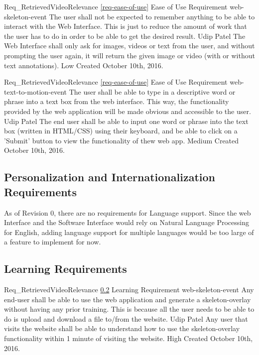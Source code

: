 \documentclass{scrreprt}
\begin{document}
\requirement
{Req_RetrievedVideoRelevance}
{\ref{req-ease-of-use} Ease of Use Requirement}
{web-skeleton-event}
{The user shall not be expected to remember anything to be able to interact with the Web Interface.}
{This is just to reduce the amount of work that the user has to do in order to be able to get the desired result.}
{Udip Patel}
{The Web Interface shall only ask for images, videos or text from the user, and without prompting the user again, it will return the given image or video (with or without text annotations).}
{Low}
{Created October 10th, 2016.}

\requirement
{Req_RetrievedVideoRelevance}
{\ref{req-ease-of-use} Ease of Use Requirement}
{web-text-to-motion-event}
{The user shall be able to type in a descriptive word or phrase into a text box from the web interface.}
{This way, the functionality provided by the web application will be made obvious and accessible to the user.}
{Udip Patel}
{The end user shall be able to input one word or phrase into the text box (written in HTML/CSS) using their keyboard, and be able to click on a 'Submit' button to view the functionality of thew web app.}
{Medium}
{Created October 10th, 2016.}

\subsection{Personalization and Internationalization Requirements}

As of Revision 0, there are no requirements for Language support. Since the web Interface and the Software Interface would rely on Natural Language Processing for English, adding language support for multiple languages would be too large of a feature to implement for now.

\subsection{Learning Requirements}
\label{req-learning}

\requirement
{Req_RetrievedVideoRelevance}
{\ref{req-learning} Learning Requirement}
{web-skeleton-event}
{Any end-user shall be able to use the web application and generate a skeleton-overlay without having any prior training.}
{This is because all the user needs to be able to do is upload and download a file to/from the website.}
{Udip Patel}
{Any user that visits the website shall be able to understand how to use the skeleton-overlay functionality within 1 minute of visiting the website.}
{High}
{Created October 10th, 2016.}
\end{document}

